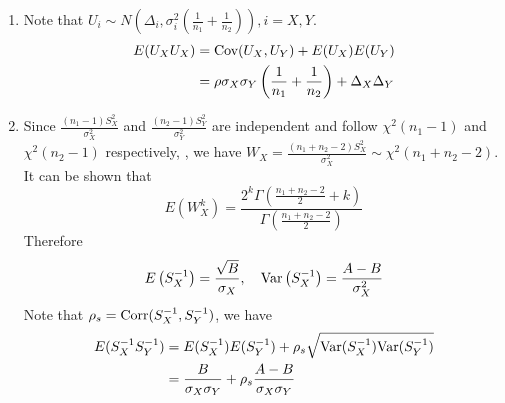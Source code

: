 	\begin{enumerate}
		\item Note that $U_i\sim N\left(\Delta_i, \sigma_i^2(\frac{1}{n_1} + \frac{1}{n_2})\right), 
		i=X, Y$. 
		\begin{equation}\label{eq1}
		\begin{aligned}
		E(U_XU_X)&= \text{Cov}(U_X, U_Y) + E(U_X)E(U_Y) \\
		&= \rho\sigma_X\sigma_Y\left(\frac{1}{n_1} + \frac{1}{n_2}\right) +
		\Delta_X\Delta_Y
		\end{aligned} 
		\end{equation}
		
		\item Since $\frac{(n_1-1)S_{X}^2}{\sigma_X^2}$ and $\frac{(n_2-1)S_{Y}^2}{\sigma_Y^2}$ are
		independent and follow $\chi^2(n_1-1)$ and $\chi^2(n_2 -1)$ respectively, , we have 
		$W_{X}=\frac{(n_1 + n_2 -2)S_X^2}{\sigma_X^2}\sim
		\chi^2(n_1 + n_2-2)$. It can be shown that 
		\[E(W_{X}^k)= \frac{2^k\Gamma(\frac{n_1 + n_2 -2}{2}+k)}{\Gamma(\frac{n_1 + n_2 -2}{2})}\] 
		Therefore 
		\begin{equation}
		\begin{aligned}
		E\left(S_X^{-1}\right) =
		\frac{\sqrt{B}}{\sigma_X},		~~~\text{Var}\left(S_X^{-1}\right) = \frac{A-B}{\sigma_X^2}
		\end{aligned}
		\end{equation}
		Note that $\rho_s = \text{Corr}(S_X^{-1}, S_Y^{-1})$, we have 
		\begin{equation}\label{eq2}
		\begin{aligned}
		E(S_X^{-1}S_Y^{-1})  &= E(S_X^{-1})E(S_Y^{-1}) + \rho_s
		\sqrt{\text{Var}(S_X^{-1})\text{Var}(S_Y^{-1})} \\
		& = \frac{B}{\sigma_X\sigma_Y} + \rho_s
		\frac{A-B}{\sigma_X\sigma_Y}
		\end{aligned}
		\end{equation}
		

\end{enumerate}

